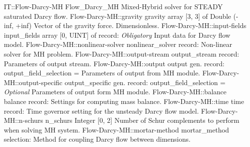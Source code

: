 \begin{RecordType}
	{IT::Flow-Darcy-MH}
	{Flow{\_}Darcy{\_}MH}
	{}%
	{}%
	{{{Mixed-Hybrid  solver for STEADY saturated Darcy flow.}%
}}
		\RecKey
			{Flow-Darcy-MH::gravity}
			{gravity}
			{{array [3, 3] of }{Double (-inf, +inf)}}{}
			{ \ValueDefault{[0, 0, -1]}}
			{{{Vector of the gravity force.
Dimensionless.}%
}}
		\RecKey
			{Flow-Darcy-MH::input-fields}
			{input{\_}fields}
			{{array [0, UINT] of }{record: }}{}
			{ \it{Obligatory}}
			{{{Input data for Darcy flow model.}%
}}
		\RecKey
			{Flow-Darcy-MH::nonlinear-solver}
			{nonlinear{\_}solver}
			{{record: }}{}
			{ \ValueDefault{{\{}{\}}}}
			{{{Non-linear solver for MH problem.}%
}}
		\RecKey
			{Flow-Darcy-MH::output-stream}
			{output{\_}stream}
			{{record: }}{}
			{ \ValueDefault{{\{}{\}}}}
			{{{Parameters of output stream.}%
}}
		\RecKey
			{Flow-Darcy-MH::output}
			{output}
			{{gen. record: }}{{output{\_}field{\_}selection}{ = }}
			{ }
			{{{Parameters of output from MH module.}%
}}
		\RecKey
			{Flow-Darcy-MH::output-specific}
			{output{\_}specific}
			{{gen. record: }}{{output{\_}field{\_}selection}{ = }}
			{ \it{Optional}}
			{{{Parameters of output form MH module.}%
}}
		\RecKey
			{Flow-Darcy-MH::balance}
			{balance}
			{{record: }}{}
			{ \ValueDefault{{\{}{\}}}}
			{{{Settings for computing mass balance.}%
}}
		\RecKey
			{Flow-Darcy-MH::time}
			{time}
			{{record: }}{}
			{ \ValueDefault{{\{}{\}}}}
			{{{Time governor setting for the unsteady Darcy flow model.}%
}}
		\RecKey
			{Flow-Darcy-MH::n-schurs}
			{n{\_}schurs}
			{{Integer [0, 2]}}{}
			{ }
			{{{Number of Schur complements to perform when solving MH system.}%
}}
		\RecKey
			{Flow-Darcy-MH::mortar-method}
			{mortar{\_}method}
			{{selection: }}{}
			{ }
			{{{Method for coupling Darcy flow between dimensions.}%
}}
\end{RecordType}
